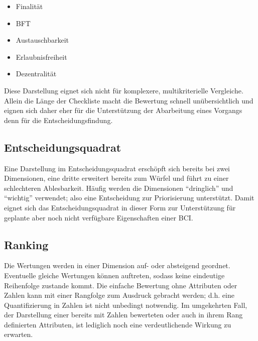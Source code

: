 \begin{itemize} \setlength\itemsep{0em}\setlength\parskip{0em}\setlength\topsep{0em}\setlength\partopsep{0em}\setlength\parsep{0em}
\item Finalität
\item \gls{BFT}
\item Austauschbarkeit
\item Erlaubnisfreiheit
\item Dezentralität
\end{itemize}

Diese Darstellung eignet sich nicht für komplexere, multikriterielle Vergleiche.
Allein die Länge der Checkliste macht die Bewertung schnell unübersichtlich und eignen sich daher eher für die Unterstützung der Abarbeitung eines Vorgangs denn für die Entscheidungsfindung.

\subsection{Entscheidungsquadrat}

Eine Darstellung im Entscheidungsquadrat erschöpft sich bereits bei zwei Dimensionen, eine dritte erweitert bereits zum Würfel und führt zu einer schlechteren Ablesbarkeit.
Häufig werden die Dimensionen \enquote{dringlich} und \enquote{wichtig} verwendet; also eine Entscheidung zur Priorisierung unterstützt.
Damit eignet sich das Entscheidungsquadrat in dieser Form \zB{} zur Unterstützung für geplante aber noch nicht verfügbare Eigenschaften einer \gls{BCI}.

\subsection{Ranking}\label{dep:ranking}

Die Wertungen werden in einer Dimension auf- oder absteigend geordnet. Eventuelle gleiche Wertungen können auftreten, sodass keine eindeutige Reihenfolge zustande kommt.
Die einfache Bewertung ohne Attributen oder Zahlen kann mit einer Rangfolge zum Ausdruck gebracht werden; d.h. eine Quantifizierung in Zahlen ist nicht unbedingt notwendig.
Im umgekehrten Fall, der Darstellung einer bereits mit Zahlen bewerteten oder auch in ihrem Rang definierten Attributen, ist lediglich noch eine verdeutlichende Wirkung zu erwarten.

